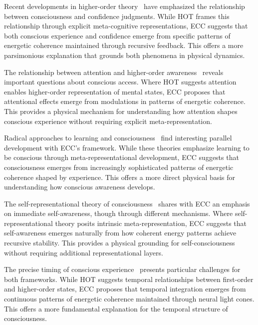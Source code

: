 Recent developments in higher-order theory~\cite{Brown2019, Block2020} have emphasized the relationship between consciousness and confidence judgments. While HOT frames this relationship through explicit meta-cognitive representations, ECC suggests that both conscious experience and confidence emerge from specific patterns of energetic coherence maintained through recursive feedback. This offers a more parsimonious explanation that grounds both phenomena in physical dynamics.

The relationship between attention and higher-order awareness~\cite{Rosenthal2019, Prinz2012} reveals important questions about conscious access. Where HOT suggests attention enables higher-order representation of mental states, ECC proposes that attentional effects emerge from modulations in patterns of energetic coherence. This provides a physical mechanism for understanding how attention shapes conscious experience without requiring explicit meta-representation.

Radical approaches to learning and consciousness~\cite{Cleeremans2011, Seth2021} find interesting parallel development with ECC's framework. While these theories emphasize learning to be conscious through meta-representational development, ECC suggests that consciousness emerges from increasingly sophisticated patterns of energetic coherence shaped by experience. This offers a more direct physical basis for understanding how conscious awareness develops.

The self-representational theory of consciousness~\cite{Kriegel2009, Gennaro2012} shares with ECC an emphasis on immediate self-awareness, though through different mechanisms. Where self-representational theory posits intrinsic meta-representation, ECC suggests that self-awareness emerges naturally from how coherent energy patterns achieve recursive stability. This provides a physical grounding for self-consciousness without requiring additional representational layers.

The precise timing of conscious experience~\cite{Gennaro2012, Dennett1992} presents particular challenges for both frameworks. While HOT suggests temporal relationships between first-order and higher-order states, ECC proposes that temporal integration emerges from continuous patterns of energetic coherence maintained through neural light cones. This offers a more fundamental explanation for the temporal structure of consciousness.


